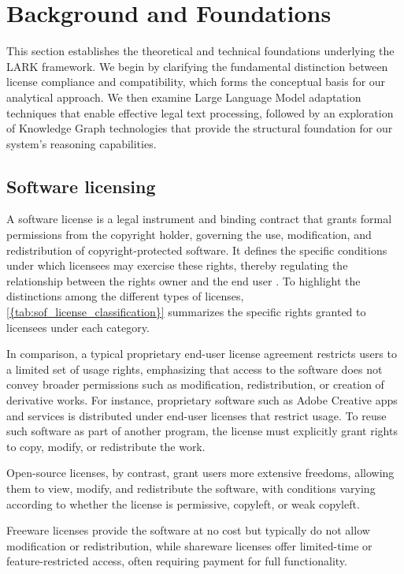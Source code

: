 \section{Background and Foundations}
\label{sec:background}

This section establishes the theoretical and technical foundations underlying the LARK framework. We begin by clarifying the fundamental distinction between license compliance and compatibility, which forms the conceptual basis for our analytical approach. We then examine Large Language Model adaptation techniques that enable effective legal text processing, followed by an exploration of Knowledge Graph technologies that provide the structural foundation for our system's reasoning capabilities.


\subsection{Software licensing}


A software license is a legal instrument and binding contract that grants formal permissions from the copyright holder, governing the use, modification, and redistribution of copyright-protected software. It defines the specific conditions under which licensees may exercise these rights, thereby regulating the relationship between the rights owner and the end user \cite{TuunanenKK09,MorinUS12}.
To highlight the distinctions among the different types of licenses, \cref{{tab:sof_license_classification}} summarizes the specific rights granted to licensees under each category.

In comparison, a typical proprietary end-user license agreement restricts users to a limited set of usage rights, emphasizing that access to the software does not convey broader permissions such as modification, redistribution, or creation of derivative works. 
For instance, proprietary software such as Adobe Creative apps and services \cite{adobe2024terms} is distributed under end-user licenses that restrict usage. To reuse such software as part of another program, the license must explicitly grant rights to copy, modify, or redistribute the work.

Open-source licenses, by contrast, grant users more extensive freedoms, allowing them to view, modify, and redistribute the software, with conditions varying according to whether the license is permissive, copyleft, or weak copyleft. 

Freeware licenses provide the software at no cost but typically do not allow modification or redistribution, while shareware licenses offer limited-time or feature-restricted access, often requiring payment for full functionality.

